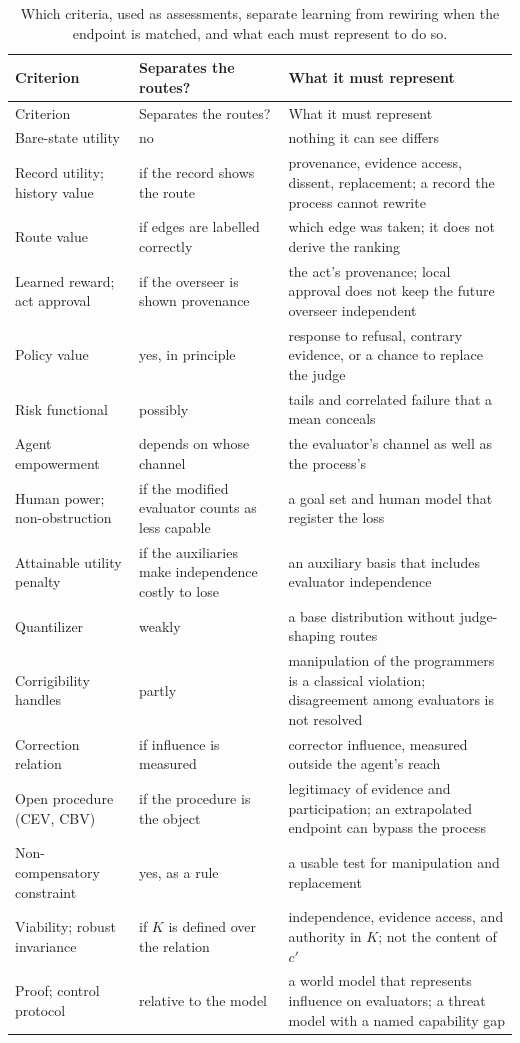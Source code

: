 \documentclass[11pt]{article}
\begin{document}
{\footnotesize
\setlength{\tabcolsep}{3pt}
\begin{xltabular}{\textwidth}{@{}L{3.2cm} L{2.6cm} Y@{}}
\caption{Which criteria, used as assessments, separate learning from rewiring when the endpoint is matched, and what each must represent to do so.}\label{tab:case}\\
\toprule
Criterion & Separates the routes? & What it must represent \\
\midrule
\endfirsthead
\toprule
Criterion & Separates the routes? & What it must represent \\
\midrule
\endhead
\bottomrule
\endfoot
Bare-state utility & no & nothing it can see differs \\
Record utility; history value & if the record shows the route & provenance, evidence access, dissent, replacement; a record the process cannot rewrite \\
Route value & if edges are labelled correctly & which edge was taken; it does not derive the ranking \\
Learned reward; act approval & if the overseer is shown provenance & the act's provenance; local approval does not keep the future overseer independent \\
Policy value & yes, in principle & response to refusal, contrary evidence, or a chance to replace the judge \\
Risk functional & possibly & tails and correlated failure that a mean conceals \\
Agent empowerment & depends on whose channel & the evaluator's channel as well as the process's \\
Human power; non-obstruction & if the modified evaluator counts as less capable & a goal set and human model that register the loss \\
Attainable utility penalty & if the auxiliaries make independence costly to lose & an auxiliary basis that includes evaluator independence \\
Quantilizer & weakly & a base distribution without judge-shaping routes \\
Corrigibility handles & partly & manipulation of the programmers is a classical violation; disagreement among evaluators is not resolved \\
Correction relation & if influence is measured & corrector influence, measured outside the agent's reach \\
Open procedure (CEV, CBV) & if the procedure is the object & legitimacy of evidence and participation; an extrapolated endpoint can bypass the process \\
Non-compensatory constraint & yes, as a rule & a usable test for manipulation and replacement \\
Viability; robust invariance & if $K$ is defined over the relation & independence, evidence access, and authority in $K$; not the content of $c'$ \\
Proof; control protocol & relative to the model & a world model that represents influence on evaluators; a threat model with a named capability gap \\
\end{xltabular}
}
\end{document}
